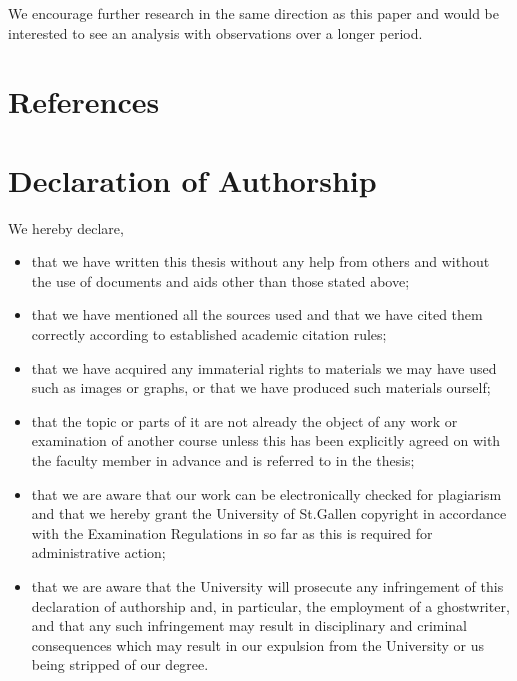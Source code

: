\documentclass[a4paper,american,12pt]{article}
\begin{document}
\begin{spacing}{1.2}
We encourage further research in the same direction as this paper and would be interested to see an analysis with observations over a longer period. 


\clearpage
		
\end{spacing}

\clearpage

\section{References}
\printbibliography[heading=none]

\clearpage

\section{Declaration of Authorship}
We hereby declare,
\begin{itemize}
\item that we have written this thesis without any help from others and without the use of documents and aids other than those stated above;
\item that we have mentioned all the sources used and that we have cited them correctly according to established academic citation rules;
\item that we have acquired any immaterial rights to materials we may have used such as images or graphs, or that we have produced such materials ourself;
\item that the topic or parts of it are not already the object of any work or examination of another course unless this has been explicitly agreed on with the faculty member in advance and is referred to in the thesis;
\item that we are aware that our work can be electronically checked for plagiarism and that we hereby grant the University of St.Gallen copyright in accordance with the Examination Regulations in so far as this is required for administrative action;
\item that we are aware that the University will prosecute any infringement of this declaration of authorship and, in particular, the employment of a ghostwriter, and that any such infringement may result in disciplinary and criminal consequences which may result in our expulsion from the University or us being stripped of our degree.
\end{itemize}
\end{document}
